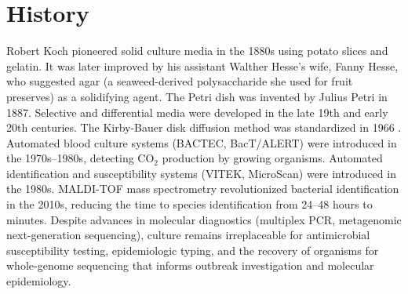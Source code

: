 \section*{History}
Robert Koch pioneered solid culture media in the 1880s using potato slices and gelatin. It was later improved by his assistant Walther Hesse's wife, Fanny Hesse, who suggested agar (a seaweed-derived polysaccharide she used for fruit preserves) as a solidifying agent. The Petri dish was invented by Julius Petri in 1887. Selective and differential media were developed in the late 19th and early 20th centuries. The Kirby-Bauer disk diffusion method was standardized in 1966 \cite{bauer1966antibiotic}. Automated blood culture systems (BACTEC, BacT/ALERT) were introduced in the 1970s--1980s, detecting CO$_2$ production by growing organisms. Automated identification and susceptibility systems (VITEK, MicroScan) were introduced in the 1980s. MALDI-TOF mass spectrometry revolutionized bacterial identification in the 2010s, reducing the time to species identification from 24--48 hours to minutes. Despite advances in molecular diagnostics (multiplex PCR, metagenomic next-generation sequencing), culture remains irreplaceable for antimicrobial susceptibility testing, epidemiologic typing, and the recovery of organisms for whole-genome sequencing that informs outbreak investigation and molecular epidemiology.

